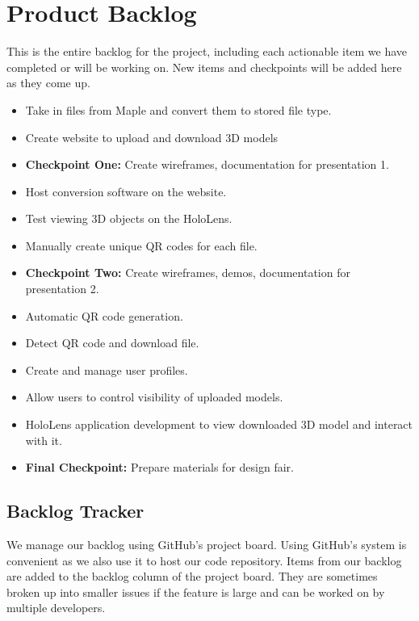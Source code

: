 

\section{Product Backlog}


This is the entire backlog for the project, including each actionable item we 
have completed or will be working on. New items and checkpoints will be added 
here as they come up.

\begin{itemize}
\item Take in files from Maple and convert them to stored file type.
\item Create website to upload and download 3D models
\item \textbf{Checkpoint One:} Create wireframes, documentation for presentation 1.
\item Host conversion software on the website.
\item Test viewing 3D objects on the HoloLens.
\item Manually create unique QR codes for each file. 
\item \textbf{Checkpoint Two:} Create wireframes, demos, documentation for presentation 
2.
\item Automatic QR code generation.
\item Detect QR code and download file.
\item Create and manage user profiles.
\item Allow users to control visibility of uploaded models.
\item HoloLens application development to view downloaded 3D model and interact 
with it.
\item \textbf{Final Checkpoint:} Prepare materials for design fair.
\end{itemize}

\subsection{Backlog Tracker}

We manage our backlog using GitHub's project board. Using GitHub's system is 
convenient as we also use it to host our code repository. Items from our backlog 
are added to the backlog column of the project board. They are sometimes broken 
up into smaller issues if the feature is large and can be worked on by multiple 
developers.

